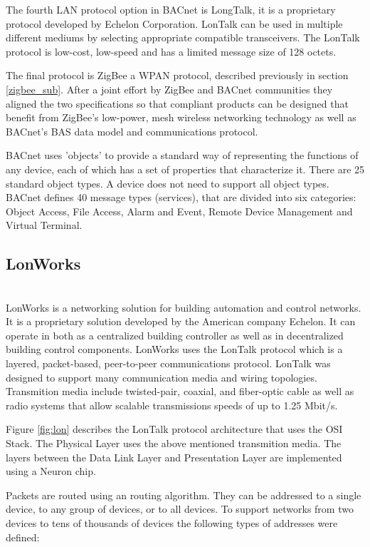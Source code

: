 The fourth LAN protocol option in BACnet is LongTalk, it is a proprietary protocol developed by Echelon Corporation. LonTalk can be used in multiple different mediums by selecting appropriate compatible transceivers. The LonTalk protocol is low-cost, low-speed and has a limited message size of 128 octets.


The final protocol is ZigBee a WPAN protocol, described previously in section \ref{zigbee_sub}. After a joint effort by ZigBee and BACnet communities they aligned the two specifications\cite{bacnet_zig} so that compliant products can be designed that benefit from ZigBee's low-power, mesh wireless networking technology as well as BACnet's BAS data model and communications protocol.



BACnet uses 'objects' to provide a standard way of representing the functions of any device, each of which has a set of properties that characterize it. There are 25 standard object types. A device does not need to support all object types. 
BACnet defines 40 message types (services), that are divided into six categories: Object Access, File Access, Alarm and Event, Remote Device Management and Virtual Terminal.




\subsection{LonWorks}\mbox{}\\

LonWorks \cite{livro_automation2,livro_automation} is a networking solution for building automation and control networks. It is a proprietary solution developed by the American company Echelon. It can operate in both as a centralized building controller as well as in decentralized building control components.
LonWorks uses the LonTalk protocol which is a layered, packet-based, peer-to-peer communications protocol. LonTalk was designed to support many communication media and wiring topologies. Transmition media include twisted-pair, coaxial, and fiber-optic cable as well as radio systems that allow scalable transmissions speeds of up to 1.25 Mbit/s.

Figure \ref{fig:lon} describes the  LonTalk protocol architecture that uses the OSI Stack. The Physical Layer uses the above mentioned transmition media. The layers between the Data Link Layer and Presentation Layer are implemented using a Neuron chip.

Packets are routed using an routing algorithm. They can be addressed to a single device, to any group of devices, or to all devices. To support networks from two devices to tens of thousands of devices
the following types of addresses were defined:

